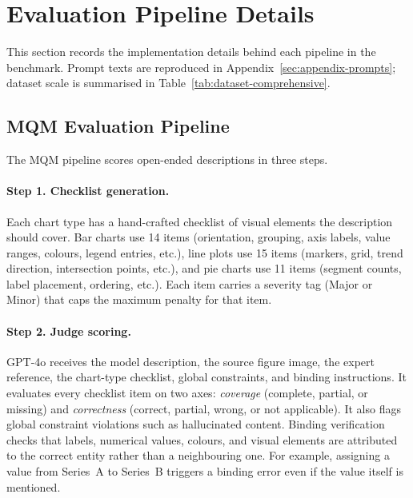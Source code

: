 
\section{Evaluation Pipeline Details}
\label{sec:appendix-eval-pipelines}

This section records the implementation details behind each pipeline in the benchmark. Prompt texts are reproduced in Appendix~\ref{sec:appendix-prompts}; dataset scale is summarised in Table~\ref{tab:dataset-comprehensive}.

\subsection{MQM Evaluation Pipeline}
\label{sec:appendix-mqm-pipeline}

The MQM pipeline scores open-ended descriptions in three steps.

\paragraph{Step 1. Checklist generation.}
Each chart type has a hand-crafted checklist of visual elements the description should cover. Bar charts use 14 items (orientation, grouping, axis labels, value ranges, colours, legend entries, etc.), line plots use 15 items (markers, grid, trend direction, intersection points, etc.), and pie charts use 11 items (segment counts, label placement, ordering, etc.). Each item carries a severity tag (Major or Minor) that caps the maximum penalty for that item.

\paragraph{Step 2. Judge scoring.}
GPT-4o receives the model description, the source figure image, the expert reference, the chart-type checklist, global constraints, and binding instructions. It evaluates every checklist item on two axes: \emph{coverage} (complete, partial, or missing) and \emph{correctness} (correct, partial, wrong, or not applicable). It also flags global constraint violations such as hallucinated content. Binding verification checks that labels, numerical values, colours, and visual elements are attributed to the correct entity rather than a neighbouring one. For example, assigning a value from Series~A to Series~B triggers a binding error even if the value itself is mentioned.

